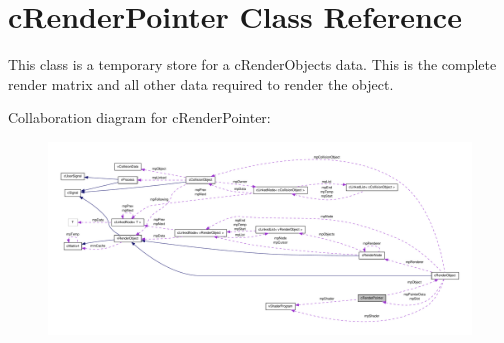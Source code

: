 \hypertarget{classc_render_pointer}{
\section{cRenderPointer Class Reference}
\label{classc_render_pointer}
}


This class is a temporary store for a cRenderObjects data. This is the complete render matrix and all other data required to render the object.  




Collaboration diagram for cRenderPointer:
\nopagebreak
\begin{figure}[H]
\begin{center}
\leavevmode
\includegraphics[width=400pt]{classc_render_pointer__coll__graph}
\end{center}
\end{figure}
